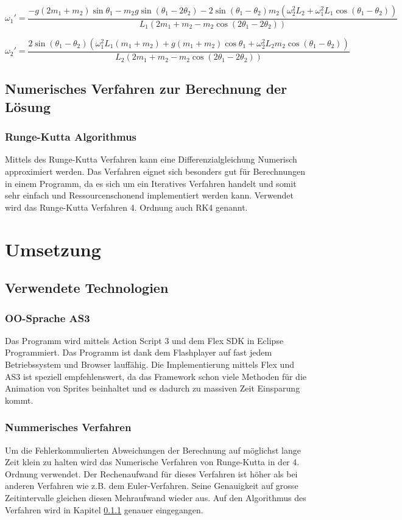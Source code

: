 \documentclass[12pt]{article}
\begin{document}
\begin{equation} \label{eq:rk:3}
	\omega_1' = \frac{-g(2m_1+m_2)\sin\theta_1 - m_2 g \sin(\theta_1 - 2\theta_2) -2\sin(\theta_1 - \theta_2)m_2(\omega_2^2 L_2 + \omega_1^2 L_1\cos(\theta_1 - \theta_2))}
	{L_1(2m_1 + m_2 - m_2 \cos(2\theta_1 - 2\theta_2))}
\end{equation}

\begin{equation} \label{eq:rk:4}
	\omega_2' = \frac{2\sin(\theta_1 - \theta_2)(\omega_1^2 L_1(m_1 + m_2) + g(m_1 + m_2)\cos\theta_1 + \omega_2^2 L_2 m_2 \cos(\theta_1 - \theta_2))}
	{L_2 (2m_1 + m_2 - m_2 \cos(2 \theta_1 - 2\theta_2))}
\end{equation}

\subsection{Numerisches Verfahren zur Berechnung der Lösung}
\subsubsection{Runge-Kutta Algorithmus} \label{cpt:rk}
Mittels des Runge-Kutta Verfahren kann eine Differenzialgleichung Numerisch approximiert werden. Das Verfahren eignet sich besonders gut für Berechnungen in einem Programm, da es sich um ein Iteratives Verfahren handelt und somit sehr einfach und Ressourcenschonend implementiert werden kann.
Verwendet wird das Runge-Kutta Verfahren 4. Ordnung auch RK4 genannt.

\newpage
\section{Umsetzung}
\subsection{Verwendete Technologien}
\subsubsection{OO-Sprache AS3}
Das Programm wird mittels Action Script 3 und dem Flex SDK in Eclipse Programmiert. Das Programm ist dank dem Flashplayer auf fast jedem Betriebssystem und Browser lauffähig.
Die Implementierung mittels Flex und AS3 ist speziell empfehlenswert, da das Framework schon viele Methoden für die Animation von Sprites beinhaltet und es dadurch zu massiven Zeit Einsparung kommt.

\subsubsection{Nummerisches Verfahren}
Um die Fehlerkommulierten Abweichungen der Berechnung auf möglichst lange Zeit klein zu halten wird das Numerische Verfahren von Runge-Kutta in der 4. Ordnung verwendet. Der Rechenaufwand für dieses Verfahren ist höher als bei anderen Verfahren wie z.B. dem Euler-Verfahren. Seine Genauigkeit auf grosse Zeitintervalle gleichen diesen Mehraufwand wieder aus. Auf den Algorithmus des Verfahren wird in Kapitel \ref{cpt:rk} genauer  eingegangen.
\end{document}
